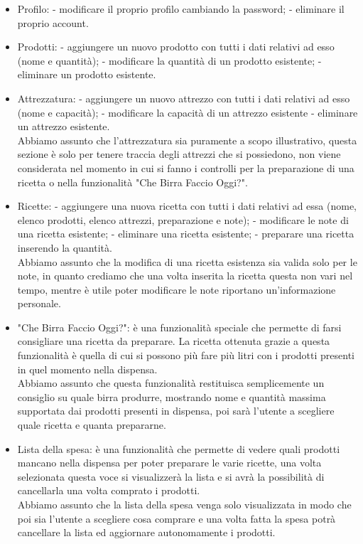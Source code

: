 \documentclass[a4paper, titlepage]{article}
\begin{document}
\begin{itemize}
    \item Profilo:
        \subitem - modificare il proprio profilo cambiando la password;
        \subitem - eliminare il proprio account.
    \item Prodotti:
        \subitem - aggiungere un nuovo prodotto con tutti i dati relativi ad esso (nome e quantità);
        \subitem - modificare la quantità di un prodotto esistente;
        \subitem - eliminare un prodotto esistente.
    \item Attrezzatura:
        \subitem - aggiungere un nuovo attrezzo con tutti i dati relativi ad esso (nome e capacità);
        \subitem - modificare la capacità di un attrezzo esistente
        \subitem - eliminare un attrezzo esistente.\\
        Abbiamo assunto che l'attrezzatura sia puramente a scopo illustrativo, questa sezione è solo per tenere traccia degli attrezzi che si possiedono, non viene considerata nel momento in cui si fanno i controlli per la preparazione di una ricetta o nella funzionalità "Che Birra Faccio Oggi?".
    \item Ricette:
        \subitem - aggiungere una nuova ricetta con tutti i dati relativi ad essa (nome, elenco prodotti, elenco attrezzi, preparazione e note);
        \subitem - modificare le note di una ricetta esistente;
        \subitem - eliminare una ricetta esistente;
        \subitem - preparare una ricetta inserendo la quantità.\\
        Abbiamo assunto che la modifica di una ricetta esistenza sia valida solo per le note, in quanto crediamo che una volta inserita la ricetta questa non vari nel tempo, mentre è utile poter modificare le note riportano un'informazione personale.
    \item "Che Birra Faccio Oggi?":
        \subitem è una funzionalità speciale che permette di farsi consigliare una ricetta da preparare. La ricetta ottenuta grazie a questa funzionalità è quella di cui si possono più fare più litri con i prodotti presenti in quel momento nella dispensa.\\
        Abbiamo assunto che questa funzionalità restituisca semplicemente un consiglio su quale birra produrre, mostrando nome e quantità massima supportata dai prodotti presenti in dispensa, poi sarà l'utente a scegliere quale ricetta e quanta prepararne.
    \item Lista della spesa:
        \subitem è una funzionalità che permette di vedere quali prodotti mancano nella dispensa per poter preparare le varie ricette, una volta selezionata questa voce si visualizzerà la lista e si avrà la possibilità di cancellarla una volta comprato i prodotti.\\
        Abbiamo assunto che la lista della spesa venga solo visualizzata in modo che poi sia l'utente a scegliere cosa comprare e una volta fatta la spesa potrà cancellare la lista ed aggiornare autonomamente i prodotti.
\end{itemize}
\newpage
\end{document}
